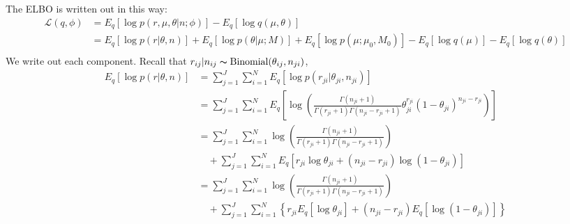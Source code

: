 \documentclass[11pt,reqno]{amsart}
\begin{document}
The ELBO is written out in this way:
\begin{equation}
\begin{split}
\label{L}
\mathcal{L}(q, \phi) &= E_q \left[ \log p\left(r,\mu,\theta | n; \phi \right)\right] - E_q \left[ \log q\left(\mu,\theta \right)\right] \\
&= E_q \left[ \log p\left(r | \theta, n \right)\right] + E_q \left[ \log p\left(\theta | \mu; M \right)\right] + E_q \left[ \log p\left(\mu ; \mu_0, M_0 \right)\right]- E_q \left[ \log q\left(\mu \right)\right]- E_q \left[ \log q\left(\theta \right)\right] \\
\end{split}
\end{equation}
We write out each component. Recall that $r_{ij}|n_{ij}\thicksim \text{Binomial}(\theta_{ij}, n _{ji})$,
\begin{equation}
\begin{split}
\label{r}
E_q \left[ \log p\left(r | \theta, n \right)\right] &= \sum_{j=1}^{J} \sum_{i=1}^{N} E_q  \left[ \log p \left( r_{ji} | \theta_{ji}, n_{ji} \right) \right] \\
&= \sum_{j=1}^{J} \sum_{i=1}^{N}  E_q  \left[ \log \left( \frac{ \Gamma(n_{ji}+1) } { \Gamma(r_{ji}+1) \Gamma( n_{ji} - r_{ji} + 1 ) } \theta_{ji}^{r_{ji}} (1 - \theta_{ji})^{n_{ji} - r_{ji}} \right) \right] \\
%
&= \sum_{j=1}^{J} \sum_{i=1}^{N} \log \left( \frac{ \Gamma(n_{ji}+1) } { \Gamma(r_{ji}+1) \Gamma( n_{ji} - r_{ji} + 1 ) }\right)  \\
&\quad + \sum_{j=1}^{J} \sum_{i=1}^{N}  E_q  \left[ r_{ji} \log \theta_{ji} + (n_{ji} - r_{ji}) \log (1 - \theta_{ji}) \right] \\
&= \sum_{j=1}^{J} \sum_{i=1}^{N} \log \left( \frac{ \Gamma(n_{ji}+1) } { \Gamma(r_{ji}+1) \Gamma( n_{ji} - r_{ji} + 1 ) }\right)  \\
&\quad + \sum_{j=1}^{J} \sum_{i=1}^{N} \left\lbrace r_{ji} E_q \left[ \log \theta_{ji} \right] + (n_{ji} - r_{ji}) E_q  \left[  \log (1 - \theta_{ji}) \right] \right\rbrace \\
\end{split}
\end{equation}
\end{document}
